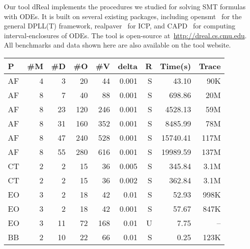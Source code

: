 \documentclass[12pt]{article}
\begin{document}
Our tool {\sf dReal} implements the procedures we studied for solving SMT formulas with ODEs. It is built on several existing packages, including {\sf opensmt}~\cite{DBLP:conf/tacas/BruttomessoPST10} for the general DPLL(T) framework, {\sf realpaver}~\cite{DBLP:journals/toms/GranvilliersB06} for ICP, and {\sf CAPD}~\cite{capd} for computing interval-enclosures of ODEs. The tool is open-source at~\url{http://dreal.cs.cmu.edu}.  All benchmarks and data shown here are also available on the tool website.
\newcommand{\hmodel}[2]{\href{http://dreal.cs.cmu.edu/#1}{#2}}
{\small
\begin{table}[!th]
  \centering
  \small
  \begin{tabular}{l|r|r|r|r|r|r|r|r}
    \hline
    \hline
    P    & \#M& \#D & \#O & \#V  & delta  & R       & Time(s) & Trace \\
    \hline
    \hline
    AF   & 4     & 3        & 20     & 44      & 0.001     & S & 43.10    & 90K      \\
    AF   & 8     & 7        & 40     & 88      & 0.001     & S & 698.86   & 20M      \\
    AF   & 8     & 23       & 120    & 246     & 0.001     & S & 4528.13  & 59M      \\
    AF   & 8     & 31       & 160    & 352     & 0.001     & S & 8485.99  & 78M      \\
    AF   & 8     & 47       & 240    & 528     & 0.001     & S & 15740.41 & 117M     \\
    AF   & 8     & 55       & 280    & 616     & 0.001     & S & 19989.59 & 137M     \\
    \hline
    \hline
    CT     & 2     & 2        & 15     & 36      & 0.005   & S & 345.84   & 3.1M      \\
    CT     & 2     & 2        & 15     & 36      & 0.002   & S & 362.84   & 3.1M      \\
    \hline
    \hline
    EO     & 3     & 2        & 18     & 42      & 0.01    & S & 52.93    & 998K      \\
    EO     & 3     & 2        & 18     & 42      & 0.001   & S & 57.67    & 847K      \\
    EO     & 3     & 11       & 72     & 168     & 0.01    & U & 7.75     & --       \\
    \hline
    \hline
    BB & 2     & 10       & 22     & 66      & 0.01        & S & 0.25     & 123K       \\


\end{tabular}
\end{table}}
\end{document}
